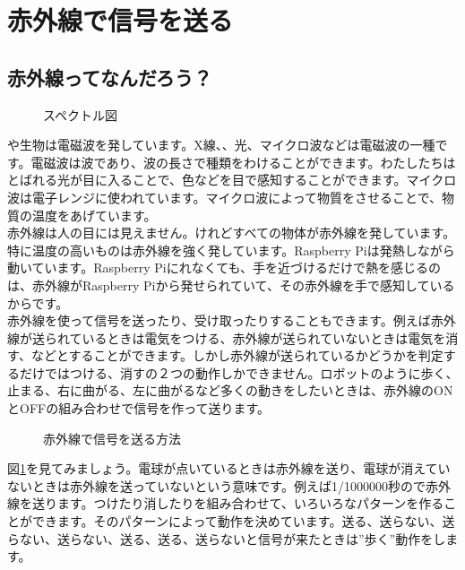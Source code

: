 \section{赤外線で信号を送る}
\subsection{赤外線ってなんだろう？}

\begin{figure}[H]
\centering

    \caption{スペクトル図}

\end{figure}

や生物は電磁波を発しています。X線、、光、マイクロ波などは電磁波の一種です。電磁波は波であり、波の長さで種類をわけることができます。わたしたちはとばれる光が目に入ることで、色などを目で感知することができます。マイクロ波は電子レンジに使われています。マイクロ波によって物質をさせることで、物質の温度をあげています。\\

赤外線は人の目には見えません。けれどすべての物体が赤外線を発しています。特に温度の高いものは赤外線を強く発しています。Raspberry Piは発熱しながら動いています。Raspberry Piにれなくても、手を近づけるだけで熱を感じるのは、赤外線がRaspberry Piから発せられていて、その赤外線を手で感知しているからです。\\

赤外線を使って信号を送ったり、受け取ったりすることもできます。例えば赤外線が送られているときは電気をつける、赤外線が送られていないときは電気を消す、などとすることができます。しかし赤外線が送られているかどうかを判定するだけではつける、消すの２つの動作しかできません。ロボットのように歩く、止まる、右に曲がる、左に曲がるなど多くの動きをしたいときは、赤外線のONとOFFの組み合わせで信号を作って送ります。

\begin{figure}[H]
\centering

\caption{赤外線で信号を送る方法}
\label{ir}
\end{figure}

図\ref{ir}を見てみましょう。電球が点いているときは赤外線を送り、電球が消えていないときは赤外線を送っていないという意味です。例えば1/1000000秒ので赤外線を送ります。つけたり消したりを組み合わせて、いろいろなパターンを作ることができます。そのパターンによって動作を決めています。送る、送らない、送らない、送らない、送る、送る、送らないと信号が来たときは”歩く”動作をします。
